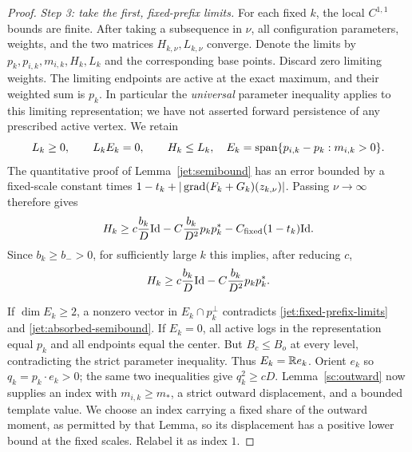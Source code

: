 \begin{proof}
\emph{Step 3: take the first, fixed-prefix limits.}
For each fixed $k$, the local $C^{1,1}$ bounds are finite.
After taking a subsequence in $\nu$, all configuration parameters,
weights, and the two matrices $H_{k,\nu},L_{k,\nu}$ converge.
Denote the limits by $p_k,p_{i,k},m_{i,k},H_k,L_k$ and the
corresponding base points. Discard zero limiting weights.
The limiting endpoints are active at the exact maximum, and
their weighted sum is $p_k$. In particular the \emph{universal}
parameter inequality applies to this limiting representation;
we have not asserted forward persistence of any prescribed
active vertex. We retain
\begin{equation}\label{jet:fixed-prefix-limits}
 L_k\ge0,\qquad L_kE_k=0,\qquad H_k\le L_k,
 \quad E_k=\operatorname{span}\{p_{i,k}-p_k:m_{i,k}>0\}.
\end{equation}
The quantitative proof of Lemma~\ref{jet:semibound} has an error
bounded by a fixed-scale constant times
$1-t_k+|\operatorname{grad}(F_k+G_k)(z_{k,\nu})|$. Passing $\nu\to\infty$
therefore gives
\[
 H_k\ge c\frac{b_k}{D}\mathrm{Id}
           -C\frac{b_k}{D^2}p_kp_k^*
           -C_{\mathrm{fixed}}(1-t_k)\mathrm{Id}.
\]
Since $b_k\ge b_->0$, for sufficiently large $k$ this implies,
after reducing $c$,
\begin{equation}\label{jet:absorbed-semibound}
 H_k\ge c\frac{b_k}{D}\mathrm{Id}
           -C\frac{b_k}{D^2}p_kp_k^*.
\end{equation}

If $\dim E_k\ge2$, a nonzero vector in $E_k\cap p_k^\perp$
contradicts \eqref{jet:fixed-prefix-limits} and
\eqref{jet:absorbed-semibound}. If $E_k=0$, all active logs in
the representation equal $p_k$ and all endpoints equal the
center. But $B_c\le B_o$ at every level, contradicting the
strict parameter inequality. Thus $E_k=\mathbb R e_k$. Orient $e_k$
so $q_k=p_k\cdot e_k>0$; the same two inequalities give
$q_k^2\ge cD$. Lemma~\ref{sc:outward} now supplies an index
with $m_{i,k}\ge m_*$, a strict outward displacement, and a
bounded template value. We choose an index carrying a fixed
share of the outward moment, as permitted by that Lemma, so
its displacement has a positive lower bound at the fixed
scales. Relabel it as index $1$.


\end{proof}
